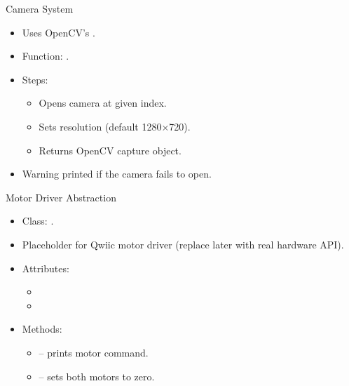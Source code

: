 \begin{frame}{Camera System}
	\begin{itemize}
		\item Uses OpenCV's .
		\item Function: .
		\item Steps:
		\begin{itemize}
			\item Opens camera at given index.
			\item Sets resolution (default 1280×720).
			\item Returns OpenCV capture object.
		\end{itemize}
		\item Warning printed if the camera fails to open.
	\end{itemize}
\end{frame}

\begin{frame}{Motor Driver Abstraction}
	\begin{itemize}
		\item Class: .
		\item Placeholder for Qwiic motor driver (replace later with real hardware API).
		\item Attributes:
		\begin{itemize}
			\item {}
			\item {}
		\end{itemize}
		\item Methods:
		\begin{itemize}
			\item {} – prints motor command.
			\item {} – sets both motors to zero.
		\end{itemize}
	\end{itemize}
\end{frame}

